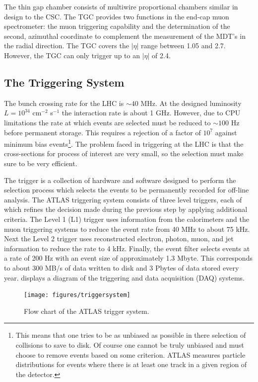 The thin gap chamber consists of multiwire proportional chambers similar
in design to the CSC. The TGC provides two functions in the end-cap muon spectrometer:
the muon triggering capability and the determination of the second, azimuthal 
coordinate to complement the measurement of the MDT's in the radial direction.
The TGC covers the $|\eta|$ range between 1.05 and 2.7. However, the TGC
can only trigger up to an $|\eta|$ of 2.4.

\subsection{The Triggering System}
The bunch crossing rate for the LHC is $\sim 40$ MHz. At the designed luminosity
$L = 10^{34}$ cm$^{-2}$ s$^{-1}$ the interaction rate is about 1 GHz. However,
due to CPU limitations the rate at which events are selected must be reduced
to $\sim 100$ Hz before permanent storage. This requires a rejection of
a factor of $10^7$ against minimum bias events\footnote{This means that
one tries to be as unbiased as possible in there selection of collisions 
to save to disk. Of course one cannot be truly unbiased and must choose
to remove events based on some criterion. ATLAS measures particle distributions
for events where there is at least one track in a given region of the detector.}.
The problem faced in triggering at the LHC is that the cross-sections for
process of interest are very small, so the selection must make sure to be very 
efficient.

The trigger is a collection of hardware and software designed to perform
the selection process which selects the events to be permanently recorded for
off-line analysis. The ATLAS triggering system consists of three level triggers,
each of which refines the decision made during the previous step by applying
additional criteria. The Level 1 (L1) trigger uses information from the
calorimeters and the muon triggering systems to reduce the event rate from
40 MHz to about 75 kHz. Next the Level 2 trigger uses reconstructed electron,
photon, muon, and jet information to reduce the rate to 4 kHz. Finally,
the event filter selects events at a rate of 200 Hz with an event size
of approximately 1.3 Mbyte. This corresponds to about 300 MB/s of data written 
to disk and 3 Pbytes of data stored every year.  displays 
a diagram of the triggering and data acquisition (DAQ) systems.

\begin{figure}[!hbpt]
  \centering
  \texttt{[image: figures/triggersystem]}
  \caption{Flow chart of the ATLAS trigger system.}
  \label{fig:trigger}
\end{figure}
